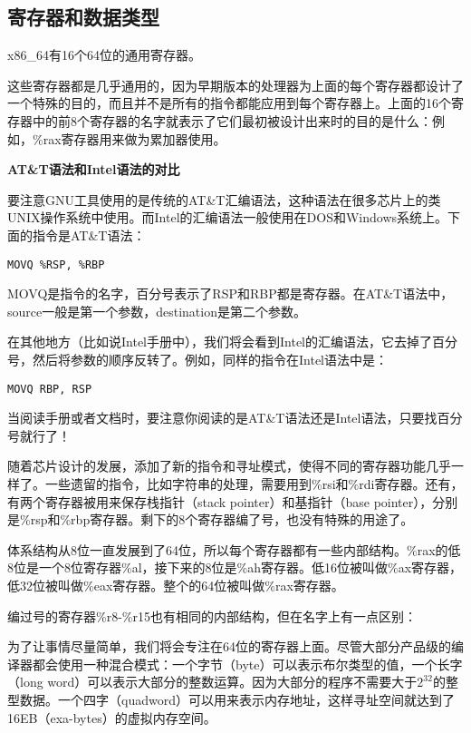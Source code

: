 \documentclass[cn,11pt,chinese]{elegantbook}
\begin{document}
\subsection{寄存器和数据类型}

x86\_64有16个64位的通用寄存器。

这些寄存器都是几乎通用的，因为早期版本的处理器为上面的每个寄存器都设计了一个特殊的目的，而且并不是所有的指令都能应用到每个寄存器上。上面的16个寄存器中的前8个寄存器的名字就表示了它们最初被设计出来时的目的是什么：例如，\%rax寄存器用来做为累加器使用。

\begin{tcolorbox}
\textbf{AT\&T语法和Intel语法的对比}

要注意GNU工具使用的是传统的AT\&T汇编语法，这种语法在很多芯片上的类UNIX操作系统中使用。而Intel的汇编语法一般使用在DOS和Windows系统上。下面的指令是AT\&T语法：

\begin{verbatim}
MOVQ %RSP, %RBP
\end{verbatim}

MOVQ是指令的名字，百分号表示了RSP和RBP都是寄存器。在AT\&T语法中，source一般是第一个参数，destination是第二个参数。

在其他地方（比如说Intel手册中），我们将会看到Intel的汇编语法，它去掉了百分号，然后将参数的顺序反转了。例如，同样的指令在Intel语法中是：

\begin{verbatim}
MOVQ RBP, RSP
\end{verbatim}

当阅读手册或者文档时，要注意你阅读的是AT\&T语法还是Intel语法，只要找百分号就行了！
\end{tcolorbox}

随着芯片设计的发展，添加了新的指令和寻址模式，使得不同的寄存器功能几乎一样了。一些遗留的指令，比如字符串的处理，需要用到\%rsi和\%rdi寄存器。还有，有两个寄存器被用来保存栈指针（stack pointer）和基指针（base pointer），分别是\%rsp和\%rbp寄存器。剩下的8个寄存器编了号，也没有特殊的用途了。

体系结构从8位一直发展到了64位，所以每个寄存器都有一些内部结构。\%rax的低8位是一个8位寄存器\%al，接下来的8位是\%ah寄存器。低16位被叫做\%ax寄存器，低32位被叫做\%eax寄存器。整个的64位被叫做\%rax寄存器。

编过号的寄存器\%r8-\%r15也有相同的内部结构，但在名字上有一点区别：

为了让事情尽量简单，我们将会专注在64位的寄存器上面。尽管大部分产品级的编译器都会使用一种混合模式：一个字节（byte）可以表示布尔类型的值，一个长字（long word）可以表示大部分的整数运算。因为大部分的程序不需要大于$2^{32}$的整型数据。一个四字（quadword）可以用来表示内存地址，这样寻址空间就达到了16EB（exa-bytes）的虚拟内存空间。
\end{document}
